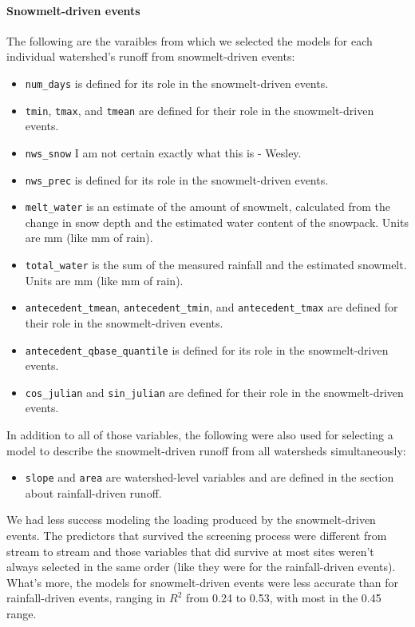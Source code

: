 \documentclass[10pt]{article}
\begin{document}
\paragraph{Snowmelt-driven events} 

The following are the varaibles from which we selected the models for each individual watershed's runoff from snowmelt-driven events:\\

\begin{itemize}
    \item \verb!num_days! is defined for its role in the snowmelt-driven events.
    \item \verb!tmin!, \verb!tmax!, and \verb!tmean! are defined for their role in the snowmelt-driven events.
    \item \verb!nws_snow! I am not certain exactly what this is - Wesley.
    \item \verb!nws_prec! is defined for its role in the snowmelt-driven events.
    \item \verb!melt_water! is an estimate of the amount of snowmelt, calculated from the change in snow depth and the estimated water content of the snowpack. Units are mm (like mm of rain).
    \item \verb!total_water! is the sum of the measured rainfall and the estimated snowmelt. Units are mm (like mm of rain).
    \item \verb!antecedent_tmean!, \verb!antecedent_tmin!, and \verb!antecedent_tmax! are defined for their role in the snowmelt-driven events.
    \item \verb!antecedent_qbase_quantile! is defined for its role in the snowmelt-driven events.
    \item \verb!cos_julian! and \verb!sin_julian! are defined for their role in the snowmelt-driven events.
\end{itemize}

In addition to all of those variables, the following were also used for selecting a model to describe the snowmelt-driven runoff from all watersheds simultaneously:

\begin{itemize}
    \item \verb!slope! and \verb!area! are watershed-level variables and are defined in the section about rainfall-driven runoff.
\end{itemize}
 
 We had less success modeling the loading produced by the snowmelt-driven events. The predictors that survived the screening process were different from stream to stream and those variables that did survive at most sites weren't always selected in the same order (like they were for the rainfall-driven events). What's more, the models for snowmelt-driven events were less accurate than for rainfall-driven events, ranging in $R^2$ from 0.24 to 0.53, with most in the 0.45 range.\\
\end{document}
